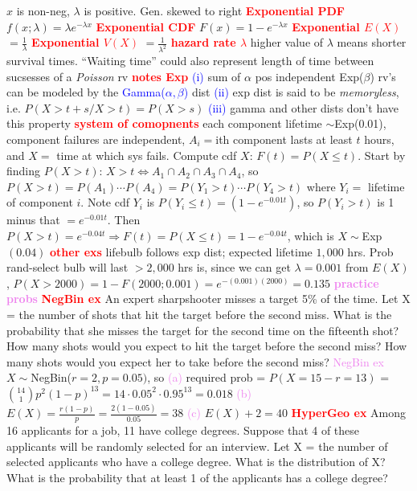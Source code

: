 \documentclass[10pt]{extarticle}
\newcommand{\dist}[3]{${#1}\mathtt{\sim}${#2}(${#3})$}
\newcommand{\re}[1]{\textcolor{red}{\textbf{#1}}}
\newcommand{\bt}[1]{\textcolor{blue}{#1}}
\newcommand{\pu}[1]{\textcolor{violet}{\textbf{#1}}}
\newcommand{\pr}[1]{\textcolor{violet}{#1}}
\begin{document}
	$x$ is non-neg, $\lambda$ is positive. Gen. skewed to right
	\re{Exponential PDF} $f(x;\lambda) = \lambda e^{-\lambda x}$
	\re{Exponential CDF} $F(x) = 1-e^{-\lambda x}$
	\re{Exponential $E(X)$} $= \frac{1}{\lambda}$
	\re{Exponential $V(X)$} $= \frac{1}{\lambda^{2}}$
	\re{hazard rate $\lambda$} higher value of $\lambda$ means shorter survival times.
	``Waiting time'' could also represent length of time between sucsesses of a
	\emph{Poisson} rv
	\re{notes Exp}
	\bt{(i)} sum of $\alpha$ pos independent Exp($\beta$) rv's can be modeled by
	the \bt{Gamma($\alpha, \beta$)} dist
	\bt{(ii)} exp dist is said to be \emph{memoryless}, i.e. $P(X>t+s/X>t)=P(X>s)$
	\bt{(iii)} gamma and other dists don't have this property
	\re{system of comopnents} each component lifetime $\mathtt{\sim}$Exp(0.01),
	component failures are independent, $A_{i}=$ith component lasts at least $t$ hours,
	and $X=$ time at which sys fails. Compute cdf $X$: $F(t) = P(X\leq t)$.
	Start by finding $P(X>t)$: $X>t \Leftrightarrow A_{1}\cap A_{2} \cap A_{3} \cap
	A_{4}$, so $P(X>t)=P(A_{1})\cdots P(A_{4}) = P(Y_{1}>t)\cdots P(Y_{4}>t)$ where
	$Y_{i}=$ lifetime of component $i$. Note cdf $Y_{i}$ is $P(Y_{i}\leq t)
	= (1 - e^{-0.01t})$, so $P(Y_{i} > t)$ is 1 minus that  $=e^{-0.01t}$. Then 
	$P(X>t) = e^{-0.04t} \Rightarrow F(t) = P(X\leq t) = 1 - e^{-0.04t}$, which is
	$X\mathtt{\sim}$Exp$(0.04)$
	\re{other exs} lifebulb follows exp dist; expected lifetime $1,000$ hrs.
	Prob rand-select bulb will last $>2,000$ hrs is, since we can get $\lambda=0.001$
	from $E(X)$, $P(X>2000) = 1 - F(2000;0.001) = e^{-(0.001)(2000)} = 0.135$
	\pu{practice probs}
	\re{NegBin ex} An expert sharpshooter misses a target 5\% of the time. Let X = {the number of
		shots that hit the target before the second miss}. What is the probability that she misses
		the target
		for the second time on the fifteenth shot? How many shots would you expect to hit the
		target before the second miss? How many shots would you expect her to take before the
		second miss?
	\pr{NegBin ex} \dist{X}{NegBin}{r=2,p=0.05}, so
		\pr{(a)} required prob = $P(X=15-r=13)$ =
			${14 \choose 1}p^{2}(1-p)^{13}=14\cdot 0.05^{2}\cdot 0.95^{13}=0.018$
		\pr{(b)} $E(X)=\frac{r(1-p)}{p}=\frac{2(1-0.05)}{0.05}=38$
		\pr{(c)} $E(X)+2=40$
	\re{HyperGeo ex} Among 16 applicants for a job, 11 have college degrees. Suppose that 4 of
		these applicants will be randomly selected for an interview. Let X = {the number of
		selected applicants who have a college degree}. What is the distribution of X? What is the
		probability that at least 1 of the applicants has a college degree?
\end{document}
